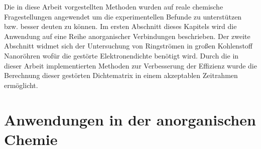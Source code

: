 Die in diese Arbeit vorgestellten Methoden wurden auf reale chemische Fragestellungen angewendet um die experimentellen Befunde zu unterstützen bzw. besser deuten zu können.
Im ersten Abschnitt dieses Kapitels wird die Anwendung auf eine Reihe anorganischer Verbindungen beschrieben. Der zweite Abschnitt widmet sich der Untersuchung von Ringströmen in großen Kohlenstoff Nanoröhren wofür die gestörte Elektronendichte benötigt wird. Durch die in dieser Arbeit implementierten Methoden zur Verbesserung der Effizienz wurde die Berechnung dieser gestörten Dichtematrix in einem akzeptablen Zeitrahmen ermöglicht. 

\section{Anwendungen in der anorganischen Chemie}
\FloatBarrier
